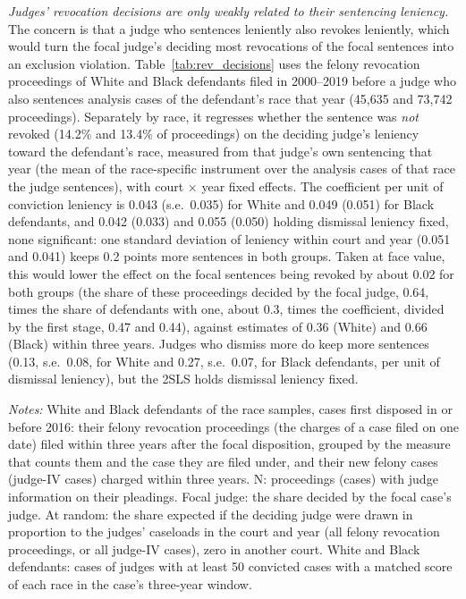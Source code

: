 \documentclass[11pt]{article}
\newcommand{\tabnote}[1]{\par\vspace{0.6ex}\begin{minipage}{\linewidth}\linespread{1}\footnotesize\textit{Notes:} #1\end{minipage}}
\newcommand{\racesamplenote}{White and Black defendants: cases of judges with at least 50 convicted cases with a matched score of each race in the case's three-year window.}
\begin{document}
\emph{Judges' revocation decisions are only weakly related to their sentencing leniency.} The concern is that a judge who sentences leniently also revokes leniently, which would turn the focal judge's deciding most revocations of the focal sentences into an exclusion violation. Table~\ref{tab:rev_decisions} uses the felony revocation proceedings of White and Black defendants filed in 2000--2019 before a judge who also sentences analysis cases of the defendant's race that year (45,635 and 73,742 proceedings). Separately by race, it regresses whether the sentence was \emph{not} revoked (14.2\% and 13.4\% of proceedings) on the deciding judge's leniency toward the defendant's race, measured from that judge's own sentencing that year (the mean of the race-specific instrument over the analysis cases of that race the judge sentences), with court $\times$ year fixed effects. The coefficient per unit of conviction leniency is 0.043 (s.e.\ 0.035) for White and 0.049 (0.051) for Black defendants, and 0.042 (0.033) and 0.055 (0.050) holding dismissal leniency fixed, none significant: one standard deviation of leniency within court and year (0.051 and 0.041) keeps 0.2 points more sentences in both groups. Taken at face value, this would lower the effect on the focal sentences being revoked by about 0.02 for both groups (the share of these proceedings decided by the focal judge, 0.64, times the share of defendants with one, about 0.3, times the coefficient, divided by the first stage, 0.47 and 0.44), against estimates of 0.36 (White) and 0.66 (Black) within three years. Judges who dismiss more do keep more sentences (0.13, s.e.\ 0.08, for White and 0.27, s.e.\ 0.07, for Black defendants, per unit of dismissal leniency), but the 2SLS holds dismissal leniency fixed.

\begin{table}[H]
\centering
\caption{Who decides the defendants' revocation proceedings and new felony cases}\label{tab:rev_judges}
{\small\setlength{\tabcolsep}{4pt}\renewcommand{\arraystretch}{0.9}\resizebox{\textwidth}{!}{}}
\tabnote{White and Black defendants of the race samples, cases first disposed in or before 2016: their felony revocation proceedings (the charges of a case filed on one date) filed within three years after the focal disposition, grouped by the measure that counts them and the case they are filed under, and their new felony cases (judge-IV cases) charged within three years. N: proceedings (cases) with judge information on their pleadings. Focal judge: the share decided by the focal case's judge. At random: the share expected if the deciding judge were drawn in proportion to the judges' caseloads in the court and year (all felony revocation proceedings, or all judge-IV cases), zero in another court. \racesamplenote}
\end{table}
\end{document}

